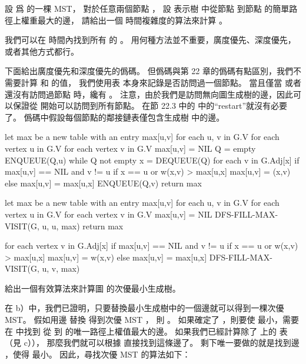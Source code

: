 \startigBase[continue]\startitem
設  爲  的一棵 MST，
對於任意兩個節點 ，
設 \m{\max[u,v]} 表示樹  中從節點  到節點  的簡單路徑上權重最大的邊，
請給出一個  時間複雜度的算法來計算 \m{\max[u,v]}。
\stopitem\stopigBase

\startANSWER
我們可以在  時間內找到所有  的 \m{\max[u,v]}。
用何種方法並不重要，廣度優先、深度優先，或者其他方式都行。

下面給出廣度優先和深度優先的僞碼。
但僞碼與第 22 章的僞碼有點區別，我們不需要計算  和  的值，
我們使用表 \m{\max} 本身來記錄是否訪問過一個節點。
當且僅當  或者還沒有訪問過節點  時，纔有 。
注意，由於我們是訪問無向圖生成樹的邊，因此可以保證從  開始可以訪問到所有節點。
在節 22.3 中的  中的“restart”就沒有必要了。
僞碼中假設每個節點的鄰接鏈表僅包含生成樹  中的邊。

\startCLRS
let max be a new table with an entry max[u,v] for each u, v in G.V
for each vertex u in G.V
	for each vertex v in G.V
		max[u,v] = NIL
	Q = empty
	ENQUEUE(Q,u)
	while Q not empty
		x = DEQUEUE(Q)
		for each v in G.Adj[x]
			if max[u,v] == NIL and v != u
				if x == u or w(x,v) > max[u,x]
					max[u,v] = (x,v)
				else
					max[u,v] = max[u,x]
				ENQUEUE(Q,v)
return max
\stopCLRS

\startCLRS
let max be a new table with an entry max[u,v] for each u, v in G.V
for each vertex u in G.V
	for each vertex v in G.V
		max[u,v] = NIL
	DFS-FILL-MAX-VISIT(G, u, u, max)
return max
\stopCLRS

\startCLRS
for each vertex v in G.Adj[x]
	if max[u,v] == NIL and v != u
		if x == u or w(x,v) > max[u,x]
			max[u,v] = w(x,v)
		else
			max[u,v] = max[u,x]
		DFS-FILL-MAX-VISIT(G, u, v, max)
\stopCLRS
\stopANSWER

\startigBase[continue]\startitem
給出一個有效算法來計算圖  的次優最小生成樹。
\stopitem\stopigBase

\startANSWER
在 b）中，我們已證明，只要替換最小生成樹中的一個邊就可以得到一棵次優 MST。
假如用邊  替換  得到次優 MST ，
則 。
如果確定了 ，則要使  最小，需要在  中找到
從  到  的唯一路徑上權值最大的邊。
如果我們已經計算除了  上的 \m{\max} 表（見 c）），
那麼我們就可以根據 \m{\max[u,v]} 直接找到這條邊了。
剩下唯一要做的就是找到邊 ，使得  最小。
因此，尋找次優 MST 的算法如下：


